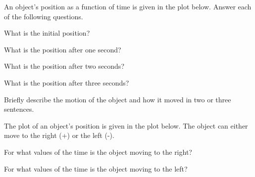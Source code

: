 


\begin{problem}
\item An object's position as a function of time is given in the plot
  below. Answer each of the following questions.

  \scalebox{0.5}{}

  \begin{subproblem}
  \item What is the initial position?
    \vfill

  \item What is the position after one second?
    \vfill

  \item What is the position after two seconds?
    \vfill

  \item What is the position after three seconds?
    \vfill

  \item Briefly describe the motion of the object and how it moved in
    two or three sentences.
    \vfill

  \end{subproblem}

  \clearpage

\item The plot of an object's position is given in the plot below. The
  object can either move to the right (+) or the left (-).

  \scalebox{0.4}{}

  \begin{subproblem}
    \item For what values of the time is the object moving to the
      right?
      \vfill
    \item For what values of the time is the object moving to the
      left?
      \vfill
  \end{subproblem}


\end{problem}

